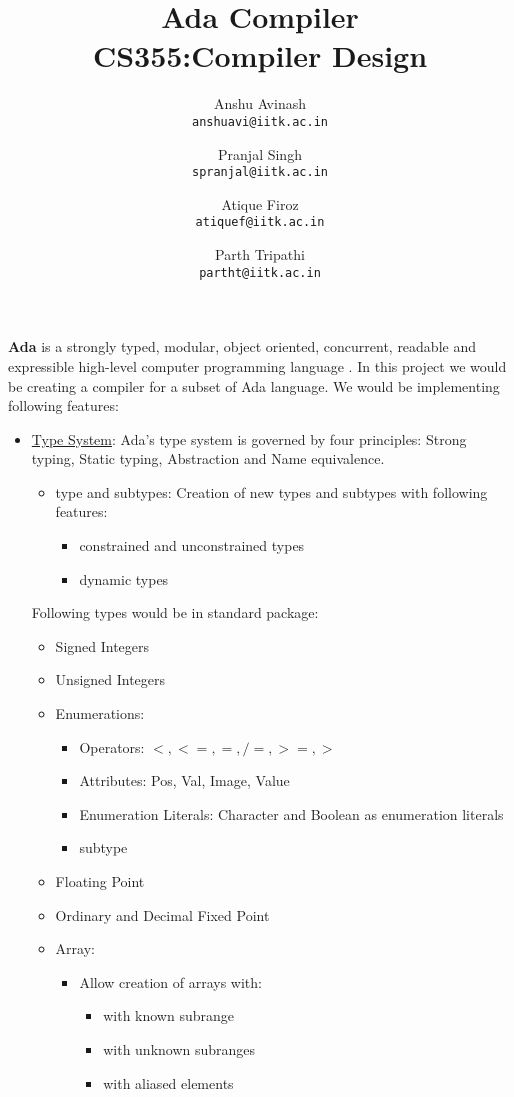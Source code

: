 \documentclass{article}
\title{
Ada Compiler \\
CS355:Compiler Design
}
\author{
Anshu Avinash\\
\texttt{anshuavi@iitk.ac.in}
\and
Pranjal Singh\\
\texttt{spranjal@iitk.ac.in}
\and
Atique Firoz\\
\texttt{atiquef@iitk.ac.in}
\and
Parth Tripathi\\
\texttt{partht@iitk.ac.in}
}
\begin{document}
\maketitle
\textbf{Ada} is a strongly typed, modular, object oriented, concurrent, readable and expressible high-level computer programming language \cite{AdaIC}. In this project we would be creating a compiler for a subset of Ada language. We would be implementing following features:
\begin{itemize}
	\item \uline{Type System}: Ada's type system is governed by four principles: Strong typing, Static typing, Abstraction and Name equivalence.
	\begin{itemize}
		\item type and subtypes: Creation of new types and subtypes with following features:
		\begin{itemize}
			\item constrained and unconstrained types
			\item dynamic types
		\end{itemize}
	\end{itemize}
	Following types would be in standard package:
	\begin{itemize}
		\item Signed Integers
		\item Unsigned Integers
		\item Enumerations:
			\begin{itemize}
				\item Operators: $<,<=,=,/=,>=,>$
				\item Attributes: Pos, Val, Image, Value
				\item Enumeration Literals: Character and Boolean as enumeration literals
				\item subtype
			\end{itemize}
		\item Floating Point
		\item Ordinary and Decimal Fixed Point
		\item Array:
		\begin{itemize}
		\item Allow creation of arrays with:
			\begin{itemize}
				\item with known subrange
				\item with unknown subranges
				\item with aliased elements
			\end{itemize}

\end{itemize}
\end{itemize}
\end{itemize}
\end{document}
